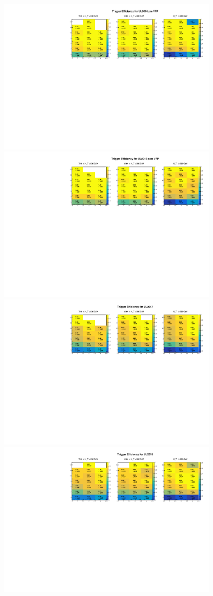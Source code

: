 \documentclass[twoside]{article}
\begin{document}
\begin{figure}[!t]
    \centering
    \includegraphics[width=.8\columnwidth]{plots/Trigger/2016_preVFP.pdf}
    \includegraphics[width=.8\columnwidth]{plots/Trigger/2016.pdf}
    \includegraphics[width=.8\columnwidth]{plots/Trigger/2017.pdf}
    \includegraphics[width=.8\columnwidth]{plots/Trigger/2018.pdf}
    

\end{figure}
\end{document}
